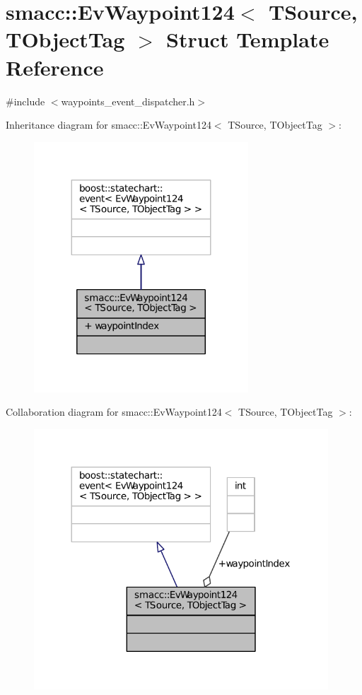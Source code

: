 \hypertarget{structsmacc_1_1EvWaypoint124}{}\section{smacc\+:\+:Ev\+Waypoint124$<$ T\+Source, T\+Object\+Tag $>$ Struct Template Reference}
\label{structsmacc_1_1EvWaypoint124}


{\ttfamily \#include $<$waypoints\+\_\+event\+\_\+dispatcher.\+h$>$}



Inheritance diagram for smacc\+:\+:Ev\+Waypoint124$<$ T\+Source, T\+Object\+Tag $>$\+:
\nopagebreak
\begin{figure}[H]
\begin{center}
\leavevmode
\includegraphics[width=227pt]{structsmacc_1_1EvWaypoint124__inherit__graph}
\end{center}
\end{figure}


Collaboration diagram for smacc\+:\+:Ev\+Waypoint124$<$ T\+Source, T\+Object\+Tag $>$\+:
\nopagebreak
\begin{figure}[H]
\begin{center}
\leavevmode
\includegraphics[width=312pt]{structsmacc_1_1EvWaypoint124__coll__graph}
\end{center}
\end{figure}
